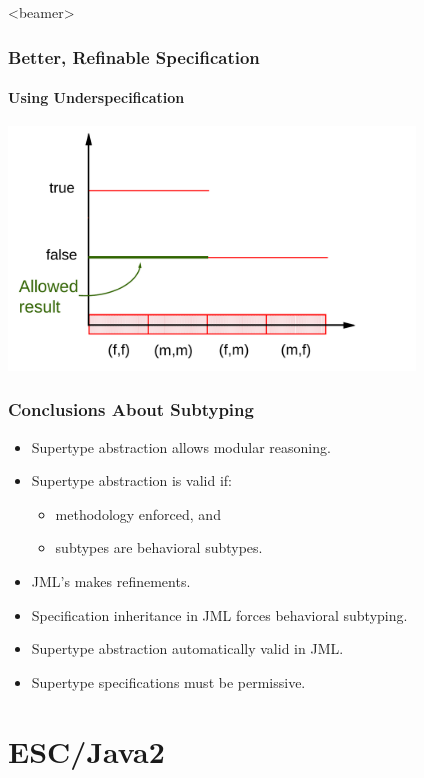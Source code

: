 \begin{frame}<beamer>
\frametitle{Better, Refinable Specification}
\framesubtitle{Using Underspecification}
\includegraphics[width=4.25in]{equalsgood}
\end{frame}

\begin{frame}
\frametitle{Conclusions About Subtyping}
\begin{itemize}
\item
Supertype abstraction allows modular reasoning.

\item
Supertype abstraction is valid if:
\begin{itemize}
\item
methodology enforced, and

\item
subtypes are behavioral subtypes.
\end{itemize}

\item
JML's  makes refinements.

\item
Specification inheritance in JML
forces behavioral subtyping.

\item
Supertype abstraction 
automatically valid in JML.

\item
Supertype specifications must be permissive.
\end{itemize}
\end{frame}


\section[ESC]{ESC/Java2}

